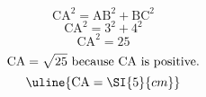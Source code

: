 \[\text{CA}^{2}=\text{AB}^{2}+\text{BC}^{2}\]
\[\text{CA}^{2}=3^{2}+4^{2}\]
\[\text{CA}^{2}=25\]
\[\text{CA}=\sqrt{\mathstrut 25}\text{ because CA is positive.}\]
\[\uline{\text{CA}=\SI{5}{cm}}\]